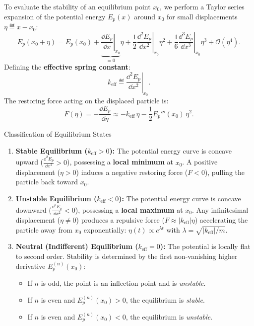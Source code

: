To evaluate the stability of an equilibrium point $x_0$, we perform a Taylor series expansion of the potential energy $E_p(x)$ around $x_0$ for small displacements $\eta \eqdef x - x_0$:
\begin{equation}
E_p(x_0 + \eta) = E_p(x_0) + \underbrace{\left.\frac{\dd E_p}{\dd x}\right|_{x_0}}_{= 0}\eta + \frac{1}{2}\left.\frac{\dd^2 E_p}{\dd x^2}\right|_{x_0}\eta^2 + \frac{1}{6}\left.\frac{\dd^3 E_p}{\dd x^3}\right|_{x_0}\eta^3 + \mathcal{O}(\eta^4).
\end{equation}
Defining the \textbf{effective spring constant}:
\begin{equation}
k_{\text{eff}} \eqdef \left.\frac{\dd^2 E_p}{\dd x^2}\right|_{x_0}.
\end{equation}
The restoring force acting on the displaced particle is:
\begin{equation}
F(\eta) = -\frac{\dd E_p}{\dd\eta} \approx -k_{\text{eff}}\,\eta - \frac{1}{2} E_p'''(x_0)\,\eta^2.
\end{equation}

\begin{lawbox}{Classification of Equilibrium States}
\begin{enumerate}[leftmargin=1.5em,itemsep=4pt]
  \item \textbf{Stable Equilibrium ($k_{\text{eff}} > 0$):}
  The potential energy curve is concave upward ($\frac{\dd^2 E_p}{\dd x^2} > 0$), possessing a \textbf{local minimum} at $x_0$. A positive displacement ($\eta > 0$) induces a negative restoring force ($F < 0$), pulling the particle back toward $x_0$.
  \item \textbf{Unstable Equilibrium ($k_{\text{eff}} < 0$):}
  The potential energy curve is concave downward ($\frac{\dd^2 E_p}{\dd x^2} < 0$), possessing a \textbf{local maximum} at $x_0$. Any infinitesimal displacement ($\eta \neq 0$) produces a repulsive force ($F \approx |k_{\text{eff}}|\eta$) accelerating the particle away from $x_0$ exponentially: $\eta(t) \propto e^{\lambda t}$ with $\lambda = \sqrt{|k_{\text{eff}}|/m}$.
  \item \textbf{Neutral (Indifferent) Equilibrium ($k_{\text{eff}} = 0$):}
  The potential is locally flat to second order. Stability is determined by the first non-vanishing higher derivative $E_p^{(n)}(x_0)$:
  \begin{itemize}[leftmargin=1.2em,itemsep=2pt]
    \item If $n$ is odd, the point is an inflection point and is \emph{unstable}.
    \item If $n$ is even and $E_p^{(n)}(x_0) > 0$, the equilibrium is \emph{stable}.
    \item If $n$ is even and $E_p^{(n)}(x_0) < 0$, the equilibrium is \emph{unstable}.
  \end{itemize}
\end{enumerate}
\end{lawbox}

